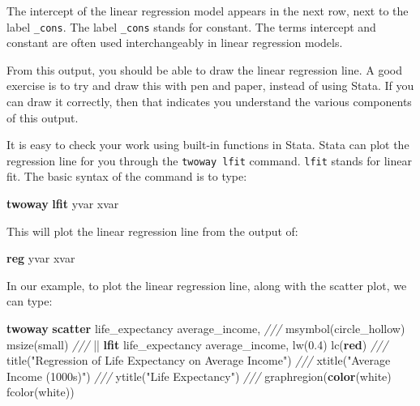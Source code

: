 \documentclass[
]{book}
\newenvironment{Shaded}{\begin{snugshade}}{\end{snugshade}}
\newcommand{\BaseNTok}[1]{\textcolor[rgb]{0.00,0.00,0.81}{#1}}
\newcommand{\CommentTok}[1]{\textcolor[rgb]{0.56,0.35,0.01}{\textit{#1}}}
\newcommand{\KeywordTok}[1]{\textcolor[rgb]{0.13,0.29,0.53}{\textbf{#1}}}
\newcommand{\NormalTok}[1]{#1}
\newcommand{\StringTok}[1]{\textcolor[rgb]{0.31,0.60,0.02}{#1}}
\begin{document}
The intercept of the linear regression model appears in the next row, next to the label \texttt{\_cons}. The label \texttt{\_cons} stands for constant. The terms intercept and constant are often used interchangeably in linear regression models.

From this output, you should be able to draw the linear regression line. A good exercise is to try and draw this with pen and paper, instead of using Stata. If you can draw it correctly, then that indicates you understand the various components of this output.

It is easy to check your work using built-in functions in Stata. Stata can plot the regression line for you through the \texttt{twoway\ lfit} command. \texttt{lfit} stands for linear fit. The basic syntax of the command is to type:

\begin{Shaded}
\begin{Highlighting}[]
\KeywordTok{twoway} \KeywordTok{lfit}\NormalTok{ yvar xvar}
\end{Highlighting}
\end{Shaded}

This will plot the linear regression line from the output of:

\begin{Shaded}
\begin{Highlighting}[]
\KeywordTok{reg}\NormalTok{ yvar xvar}
\end{Highlighting}
\end{Shaded}

In our example, to plot the linear regression line, along with the scatter plot, we can type:

\begin{Shaded}
\begin{Highlighting}[]
\KeywordTok{twoway} \KeywordTok{scatter}\NormalTok{ life\_expectancy average\_income, }\CommentTok{///}
    \BaseNTok{msymbol}\NormalTok{(}\BaseNTok{circle\_hollow}\NormalTok{) msize(small) }\CommentTok{///}
\NormalTok{    || }\KeywordTok{lfit}\NormalTok{ life\_expectancy average\_income, lw(0.4) lc(}\KeywordTok{red}\NormalTok{) }\CommentTok{///}
    \BaseNTok{title}\NormalTok{(}\StringTok{"Regression of Life Expectancy on Average Income"}\NormalTok{) }\CommentTok{///}
    \BaseNTok{xtitle}\NormalTok{(}\StringTok{"Average Income (1000s)"}\NormalTok{) }\CommentTok{///}
    \BaseNTok{ytitle}\NormalTok{(}\StringTok{"Life Expectancy"}\NormalTok{) }\CommentTok{///}
\NormalTok{    graphregion(}\KeywordTok{color}\NormalTok{(}\BaseNTok{white}\NormalTok{) fcolor(}\BaseNTok{white}\NormalTok{)) }
\end{Highlighting}
\end{Shaded}
\end{document}
